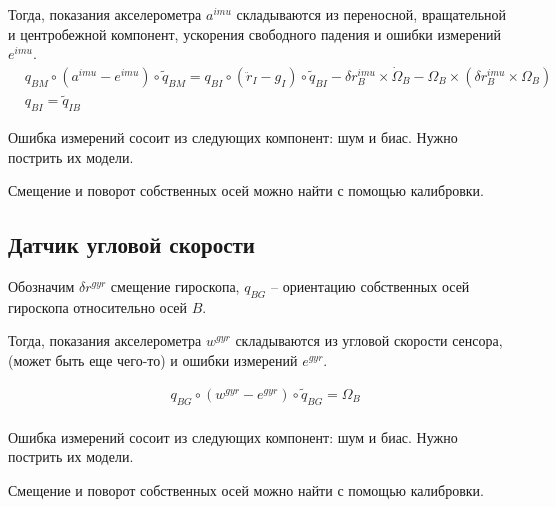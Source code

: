 \documentclass[a4paper,12pt]{article}
\begin{document}
Тогда, показания акселерометра $a^{imu}$ складываются из переносной, вращательной и центробежной компонент, ускорения свободного падения и ошибки измерений $e^{imu}$.
\begin{align*} 
&q_{BM} \circ (a^{imu} - e^{imu}) \circ \tilde{q}_{BM} = 
{q}_{BI} \circ (\ddot{r}_{I} - g_I) \circ \tilde{q}_{BI}
 - {\delta r^{imu}_B}  \times \dot{\Omega}_B
 - \Omega_B \times (\delta r^{imu}_B \times \Omega_B)
\\
&q_{BI} = \tilde{q}_{IB}
\end{align*}

Ошибка измерений сосоит из следующих компонент: шум и биас. Нужно пострить их модели.

Смещение и поворот собственных осей можно найти с помощью калибровки.

\subsection{Датчик угловой скорости}
Обозначим $\delta r^{\textit{gyr}}$ смещение гироскопа,  $q_{BG}$ -- ориентацию собственных осей гироскопа относительно осей $B$.

Тогда, показания акселерометра $w^{\textit{gyr}}$ складываются из угловой скорости сенсора, (может быть еще чего-то) и ошибки измерений $e^{\textit{gyr}}$.

\begin{align*} 
&q_{BG} \circ (w^{\textit{gyr}} - e^{\textit{gyr}}) \circ \tilde{q}_{BG} = 
\Omega_B
\\
\end{align*}

Ошибка измерений сосоит из следующих компонент: шум и биас. Нужно пострить их модели.

Смещение и поворот собственных осей можно найти с помощью калибровки.
\end{document}
